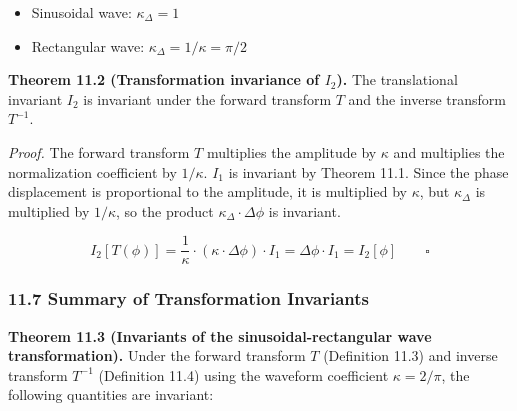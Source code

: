 \documentclass[a4paper,11pt]{article}
\providecommand{\tightlist}{\setlength{\itemsep}{0pt}\setlength{\parskip}{0pt}}
\begin{document}
\begin{itemize}
\tightlist
\item
  Sinusoidal wave: \(\kappa_\Delta = 1\)
\item
  Rectangular wave: \(\kappa_\Delta = 1/\kappa = \pi/2\)
\end{itemize}

\textbf{Theorem 11.2 (Transformation invariance of \(I_2\)).} The
translational invariant \(I_2\) is invariant under the forward transform
\(T\) and the inverse transform \(T^{-1}\).

\emph{Proof.} The forward transform \(T\) multiplies the amplitude by
\(\kappa\) and multiplies the normalization coefficient by \(1/\kappa\).
\(I_1\) is invariant by Theorem 11.1. Since the phase displacement is
proportional to the amplitude, it is multiplied by \(\kappa\), but
\(\kappa_\Delta\) is multiplied by \(1/\kappa\), so the product
\(\kappa_\Delta \cdot \Delta\phi\) is invariant.

\[I_2[T(\phi)] = \frac{1}{\kappa} \cdot (\kappa \cdot \Delta\phi) \cdot I_1 = \Delta\phi \cdot I_1 = I_2[\phi] \qquad \square\]

\subsubsection{11.7 Summary of Transformation
Invariants}\label{summary-of-transformation-invariants}

\textbf{Theorem 11.3 (Invariants of the sinusoidal-rectangular wave
transformation).} Under the forward transform \(T\) (Definition 11.3)
and inverse transform \(T^{-1}\) (Definition 11.4) using the waveform
coefficient \(\kappa = 2/\pi\), the following quantities are invariant:
\end{document}
